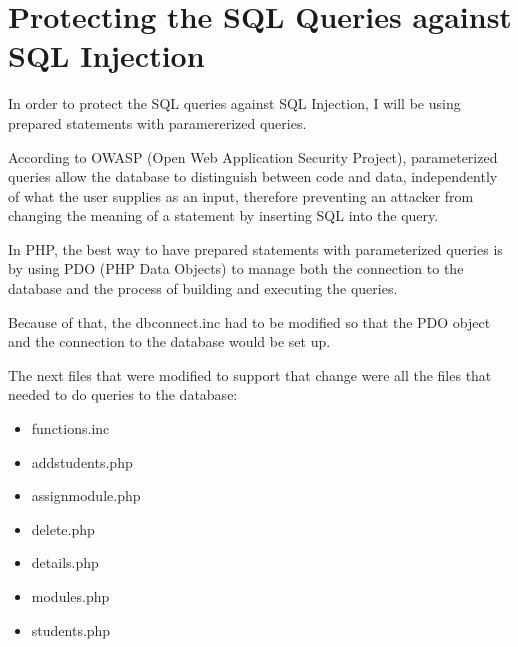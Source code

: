 \chapter{Protecting the SQL Queries against SQL Injection}

In order to protect the SQL queries against SQL Injection, I will be using prepared statements with paramererized queries.

According to OWASP (Open Web Application Security Project), parameterized queries allow the database to distinguish between code and data, independently of what the user supplies as an input, therefore preventing an attacker from changing the meaning of a statement by inserting SQL into the query.

In PHP, the best way to have prepared statements with parameterized queries is by using PDO (PHP Data Objects) to manage both the connection to the database and the process of building and executing the queries.

Because of that, the dbconnect.inc had to be modified so that the PDO object and the connection to the database would be set up.

\captionsetup{type=figure}


The next files that were modified to support that change were all the files that needed to do queries to the database:

\begin{itemize}
  \item functions.inc
  \item addstudents.php
  \item assignmodule.php
  \item delete.php
  \item details.php
  \item modules.php
  \item students.php
\end{itemize}

\captionsetup{type=figure}


\captionsetup{type=figure}


\captionsetup{type=figure}


\captionsetup{type=figure}


\captionsetup{type=figure}


\captionsetup{type=figure}


\captionsetup{type=figure}

